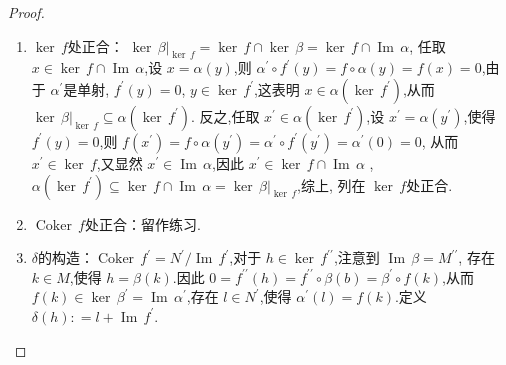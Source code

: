 \documentclass[../../几何与拓扑.tex]{subfiles}
\begin{document}
\begin{proof}
  \begin{enumerate}
    \item \(  \operatorname{ker}\,f  \)处正合： \(  \operatorname{ker}\,\beta |_{\operatorname{ker}\,f}= \operatorname{ker}\,f\cap \operatorname{ker}\,\beta  =  \operatorname{ker}\,f\cap \operatorname{Im}\,\alpha  \),
    任取 \(  x \in \operatorname{ker}\,f\cap \operatorname{Im}\,\alpha   \),设 \(  x =  \alpha \left( y \right)   \),则 \(  \alpha ^{\prime} \circ f^{\prime}  \left( y \right)= f\circ \alpha \left( y \right)=  f\left( x \right)= 0     \),由于 \(  \alpha ^{\prime}   \)是单射, \(  f^{\prime} \left( y \right)= 0   \),
     \(  y \in \operatorname{ker}\,f^{\prime}   \),这表明 \(  x  \in  \alpha \left( \operatorname{ker}\,f^{\prime}  \right)   \),从而 \(  \operatorname{ker}\,\beta |_{\operatorname{ker}\,f}\subseteq \alpha \left( \operatorname{ker}\,f^{\prime}  \right)   \).
     反之,任取 \(  x^{\prime}  \in \alpha \left( \operatorname{ker}\,f^{\prime}  \right)   \),设 \(  x^{\prime}  =  \alpha \left( y^{\prime}  \right)   \),使得 \(  f^{\prime} \left( y \right)= 0   \),则 \(  f\left( x^{\prime}  \right)=  f\circ \alpha \left( y^{\prime}  \right)=  \alpha ^{\prime} \circ f^{\prime} \left( y^{\prime}  \right)= \alpha ^{\prime} \left( 0 \right)= 0      \),
     从而 \(  x^{\prime}  \in \operatorname{ker}\,f  \),又显然 \(  x^{\prime}  \in \operatorname{Im}\,\alpha   \),因此 \(  x^{\prime}  \in \operatorname{ker}\,f\cap \operatorname{Im}\,\alpha   \)  , \(  \alpha \left( \operatorname{ker}\,f^{\prime}  \right)\subseteq \operatorname{ker}\,f\cap \operatorname{Im}\,\alpha = \operatorname{ker}\,\beta |_{\operatorname{ker}\,f}   \),综上, 列在 \(  \operatorname{ker}\,f  \)处正合.
     \item \(  \operatorname{Coker}\,f  \)处正合：留作练习.   
     \item \(   \delta    \)的构造：\(  \operatorname{Coker}\,f^{\prime} = N ^{\prime} / \operatorname{Im}\,f ^{ \prime}   \),对于 \(  h \in \operatorname{ker}\, f ^{\prime \prime}   \),注意到 \(  \operatorname{Im}\,\beta  =  M ^{\prime \prime}   \),
    存在 \( k \in M  \),使得 \(  h =  \beta \left( k \right)   \).因此 \( 0 =  f ^{\prime \prime} \left( h \right) =   f ^{\prime \prime} \circ \beta \left( b \right) =  \beta ^{\prime} \circ f \left( k\right)    \),从而 \(  f\left( k \right) \in  \operatorname{ker}\,\beta  ^{\prime}  =  \operatorname{Im}\,\alpha ^{\prime}   \),存在    
    \(  l \in N^{\prime}   \),使得 \(  \alpha ^{\prime} \left( l \right) =  f\left( k \right)    \).定义 \(   \delta  \left( h \right): =  l+  \operatorname{Im}\,f^{\prime}    \).
    

\end{enumerate}
\end{proof}
\end{document}
